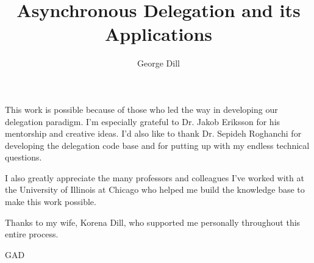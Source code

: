 \documentclass{uicthesi}
\begin{document}

\title{Asynchronous Delegation and its Applications}
\author{George Dill}
\maketitle




 \acknowledgements
{This work is possible because of those who led the way in developing our delegation paradigm. I'm especially grateful to Dr. Jakob Eriksson for his mentorship and creative ideas. I'd also like to thank Dr. Sepideh Roghanchi for developing the delegation code base and for putting up with my endless technical questions. 

I also greatly appreciate the many professors and colleagues I've worked with at the University of Illinois at Chicago who helped me build the knowledge base to make this work possible. 

Thanks to my wife, Korena Dill, who supported me personally throughout this entire process. 
\\ 

\begin{flushright}GAD\end{flushright}}


\preface
\end{document}
